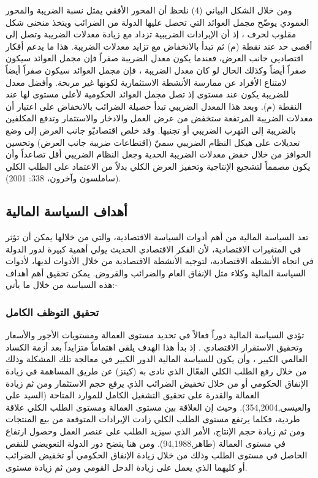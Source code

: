 \documentclass[10pt,a4paper]{report}
\begin{document}
\begin{doublespacing}
ومن خلال الشكل البياني (4) نلحظ أن المحور الأفقي يمثل نسبة الضريبة والمحور العمودي يوضّح مجمل العوائد التي تحصل عليها الدولة من الضرائب ويتخذ منحنى  شكل مقلوب لحرف ، إذ أن الإيرادات الضريبية تزداد مع زيادة معدلات الضريبة وتصل إلى أقصى حد عند نقطة {(م)} ثم تبدأ بالانخفاض مع تزايد معدلات الضريبة. هذا ما يدعم أفكار اقتصاديي جانب العرض، فعندما يكون معدل الضريبة صفراً فإن مجمل العوائد سيكون صفراً أيضاً وكذلك الحال لو كان معدل الضريبة ، فإن مجمل العوائد سيكون صفراً أيضاً لامتناع الأفراد عن ممارسة الأنشطة الاستثمارية لكونها غير مربحة. وأفضل معدل للضريبة يكون عند مستوى  إذ تصل مجمل العوائد الحكومية لأعلى مستوى لها عند النقطة {(م)}. 
وبعد هذا المعدل الضريبي تبدأ حصيلة الضرائب بالانخفاض على اعتبار أن معدلات الضريبة المرتفعة ستخفض من عرض العمل والادخار والاستثمار وتدفع المكلفين بالضريبة إلى التهرب الضريبي أو تجنبها. وقد خلص اقتصاديّو جانب العرض إلى وضع تعديلات على هيكل النظام الضريبي سميّ {(اقتطاعات ضريبة جانب العرض)} وتحسين الحوافز من خلال خفض معدلات الضريبة الحدية وجعل النظام الضريبي أقل تصاعداً وأن يكون مصمماً لتشجيع الإنتاجية وتحفيز العرض الكلي بدلاً من الاعتماد على الطلب الكلي {(ساملسون وآخرون، 338: 2001)}.
\subsection{أهداف السياسة المالية}
تعد السياسة المالية من أهم أدوات السياسة الاقتصادية، والتي من خلالها يمكن أن تؤثر في المتغيرات الاقتصادية، لأن الفكر الاقتصادي الحديث يولي أهمية كبيرة لدور الدولة في اتجاه الأنشطة الاقتصادية، لتوجيه الأنشطة الاقتصادية من خلال الأدوات لديها، لأدوات السياسة المالية وكلاء مثل الإنفاق العام والضرائب والقروض. يمكن تحقيق أهم أهداف هذه السياسة من خلال ما يأتي:-
\subsubsection{تحقيق التوظف الكامل}
تؤدي السياسة المالية دوراً فعالاً في تحديد مستوى العمالة ومستويات الأجور والأسعار وتحقيق الاستقرار الاقتصادي . إذ بدأ هذا الهدف يلقى اهتماماً متزايداً بعد أزمة الكساد العالمي الكبير ، وأن يكون للسياسة المالية الدور الكبير في معالجة تلك المشكلة وذلك من خلال رفع الطلب الكلي الفعّال الذي نادى به {(كينز)} عن طريق المساهمة في زيادة الإنفاق الحكومي أو من خلال تخفيض الضرائب الذي يرفع حجم الاستثمار ومن ثم زيادة العمالة والقدرة على تحقيق التشغيل الكامل للموارد المتاحة {(السيد علي والعيسى,354,2004)}. وحيث إن العلاقة بين مستوى العمالة ومستوى الطلب الكلي علاقة طردية، فكلما يرتفع مستوى الطلب الكلي زادت الإيرادات المتوقعة من بيع المنتجات ومن ثم زيادة حجم الإنتاج، الأمر الذي سيزيد الطلب على عنصر العمل وحصول ارتفاع في مستوى العمالة {(طاهر,94,1988)}. ومن هنا يتضح دور الدولة التعويضي للنقص الحاصل في مستوى الطلب وذلك من خلال زيادة الإنفاق الحكومي أو تخفيض الضرائب أو كليهما الذي يعمل على زيادة الدخل القومي ومن ثم زيادة مستوى.

\end{doublespacing}
\end{document}
